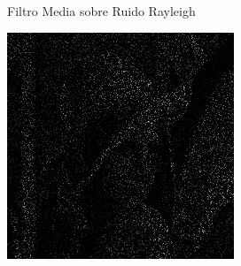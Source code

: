 \documentclass{beamer}
\begin{document}
\begin{frame}[fragile]{Filtro Media sobre Ruido Rayleigh}
\begin{minipage}{0.25\linewidth}
	\end{minipage}\hfill
	\begin{minipage}{0.25\linewidth}
		\centering
		\includegraphics[width=\linewidth]{../results/lena_rayleigh_xi10}
	\end{minipage}
	

\end{frame}
\end{document}
